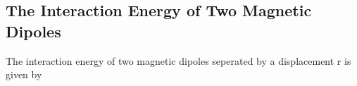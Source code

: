 \subsection{The Interaction Energy of Two Magnetic Dipoles}
The interaction energy of two magnetic dipoles seperated by a displacement r is given by\\
\begin{center}
\end{center} 
